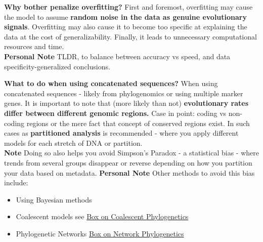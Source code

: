 \documentclass[11pt]{report}
\begin{document}
{\begin{tcolorbox}[label=box:modeltesting, colback=gray!10!white, coltitle=white, colframe=gray!80!black, title=Model Testing in Phylogenetics, breakable]
\textbf{Why bother penalize overfitting?}
First and foremost, overfitting may cause the model to assume \textbf{random noise in the data as genuine evolutionary signals}. Overfitting may also cause it to become too specific at explaining the data at the cost of generalizability. Finally, it leads to unnecessary computational resources and time. \\
\textbf{Personal Note} TLDR, to balance between accuracy vs speed, and data specificity-generalized conclusions. 

\textbf{What to do when using concatenated sequences?}
When using concatenated sequences - likely from phylogenomics or using multiple marker genes. It is important to note that (more likely than not) \textbf{evolutionary rates differ between different genomic regions.} Case in point: coding vs non-coding regions or the mere fact that concept of conserved regions exist.  In such cases as \textbf{partitioned analysis} is recommended - where you apply different models for each stretch of DNA or partition.\\
\textbf{Note} Doing so also helps you avoid Simpson's Paradox - a statistical bias - where trends from several groups disappear or reverse depending on how you partition your data based on metadata.
\textbf{Personal Note} Other methods to avoid this bias include:
\begin{itemize}
	\item Using Bayesian methods 
	\item Coalescent models see \hyperref[Coalescent]{Box on Coalescent Phylogenetics}
	\item Phylogenetic Networks \hyperref[Network Phylogenetics]{Box on Network Phylogenetics}
\end{itemize} 
 
	
\end{tcolorbox}



\begin{tcolorbox}[label=box:Coalescent, colback=gray!10!white, coltitle=white, colframe=gray!80!black, title=Coalescent, breakable]
	
\end{tcolorbox}
	
	
\begin{tcolorbox}[label=box:Network Phylogenetics, colback=gray!10!white, coltitle=white, colframe=gray!80!black, title=Networks in Phylogenetics, breakable]
\end{tcolorbox}

\begin{tcolorbox}[label=box:Benchmarking, colback=gray!10!white, coltitle=white, colframe=gray!80!black, title=Benchmarking, breakable]
	


\end{tcolorbox}}
\end{document}
